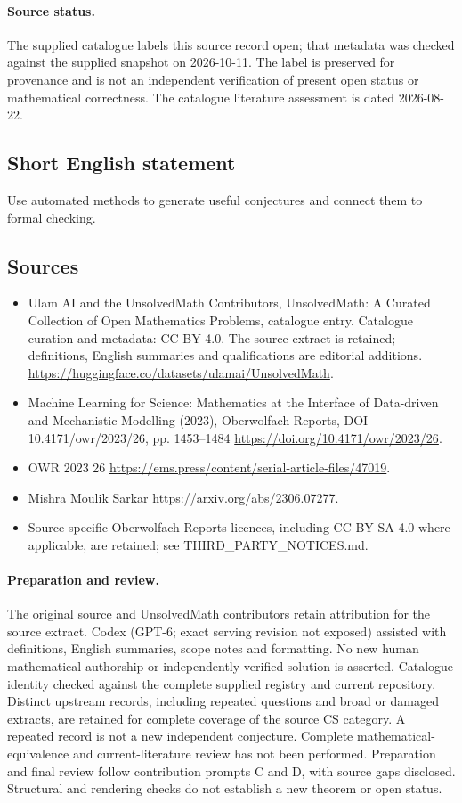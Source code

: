 \documentclass[11pt]{article}
\begin{document}
\paragraph{Source status.}
The supplied catalogue labels this source record open; that metadata was checked against the supplied snapshot on 2026-10-11. The label is preserved for provenance and is not an independent verification of present open status or mathematical correctness. The catalogue literature assessment is dated 2026-08-22.
\subsection{Short English statement}
Use automated methods to generate useful conjectures and connect them to formal checking.
\subsection{Sources}
\begin{itemize}
\item[S1] Ulam AI and the UnsolvedMath Contributors, UnsolvedMath: A Curated Collection of Open Mathematics Problems, catalogue entry. Catalogue curation and metadata: CC BY 4.0. The source extract is retained; definitions, English summaries and qualifications are editorial additions.
\url{https://huggingface.co/datasets/ulamai/UnsolvedMath}.
\item[S2] Machine Learning for Science: Mathematics at the Interface of Data-driven and Mechanistic Modelling (2023), Oberwolfach Reports, DOI 10.4171/owr/2023/26, pp. 1453--1484
\url{https://doi.org/10.4171/owr/2023/26}.
\item[S3] OWR 2023 26
\url{https://ems.press/content/serial-article-files/47019}.
\item[S4] Mishra Moulik Sarkar
\url{https://arxiv.org/abs/2306.07277}.
\item Source-specific Oberwolfach Reports licences, including CC BY-SA 4.0 where applicable, are retained; see THIRD\_PARTY\_NOTICES.md.
\end{itemize}
\paragraph{Preparation and review.}
The original source and UnsolvedMath contributors retain attribution for the source extract. Codex (GPT-6; exact serving revision not exposed) assisted with definitions, English summaries, scope notes and formatting. No new human mathematical authorship or independently verified solution is asserted. Catalogue identity checked against the complete supplied registry and current repository. Distinct upstream records, including repeated questions and broad or damaged extracts, are retained for complete coverage of the source CS category. A repeated record is not a new independent conjecture. Complete mathematical-equivalence and current-literature review has not been performed. Preparation and final review follow contribution prompts C and D, with source gaps disclosed. Structural and rendering checks do not establish a new theorem or open status.
\label{end:statement}
\end{document}
